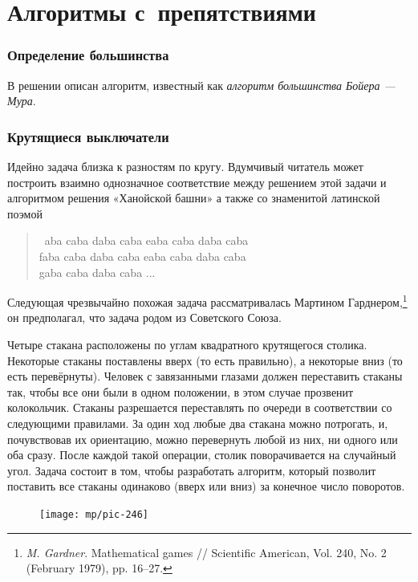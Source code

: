 \documentclass[twoside]{book}
\begin{document}
\section{Алгоритмы с~препятствиями}

\subsubsection*{Определение большинства}
В решении описан алгоритм, известный как \emph{алгоритм большинства Бойера --- Мура}. 


\subsubsection*{Крутящиеся выключатели}
Идейно задача близка к разностям по кругу.
Вдумчивый читатель может построить взаимно однозначное соответствие между решением этой задачи и алгоритмом решения «Ханойской башни» а также со знаменитой латинской поэмой
\begin{verse}
\ aba caba daba caba eaba caba daba caba\\
faba caba daba caba eaba caba daba caba\\
gaba caba daba caba ...
\end{verse}


Следующая чрезвычайно похожая задача рассматривалась Мартином Гарднером,\footnote{
\emph{M. Gardner}.
Mathematical games /\!/ Scientific American, Vol. 240, No. 2 (February 1979), pp. 16--27.}
он предполагал, что задача родом из Советского Союза. 

Четыре стакана расположены по углам квадратного крутящегося столика.
Некоторые стаканы поставлены вверх (то есть правильно), а некоторые вниз (то есть перевёрнуты). Человек с завязанными глазами должен переставить стаканы так, чтобы все они были в одном положении, в этом случае прозвенит колокольчик.
Стаканы разрешается переставлять по очереди в соответствии со следующими правилами.
За один ход любые два стакана можно потрогать, и, почувствовав их ориентацию, можно перевернуть любой из них, ни одного или оба сразу.
После каждой такой операции, столик поворачивается на случайный угол.
Задача состоит в том, чтобы разработать алгоритм, который позволит 
поставить все стаканы одинаково (вверх или вниз) за конечное число поворотов.

\begin{figure}
\vskip-0mm
\centering
\texttt{[image: mp/pic-246]}
\end{figure}
\end{document}
